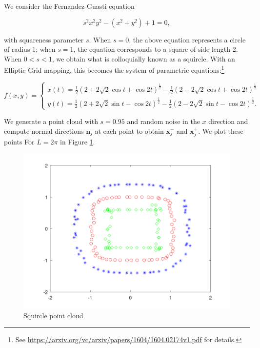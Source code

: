 \begin{solution}
  We consider the Fernandez-Guasti equation

  $$
  s^2 x^2 y^2 - \left( x^2 + y^2 \right) + 1 = 0,
  $$

  with squareness parameter $s$. When $s = 0$, the above equation represents a circle of radius 1; when $s = 1$, the 
  equation corresponds to a square of side length 2. When $0 < s < 1$, we obtain what is colloquially known as a 
  squircle. With an Elliptic Grid mapping, this becomes the system of parametric equations:\footnote{
    See \href{https://arxiv.org/vc/arxiv/papers/1604/1604.02174v1.pdf}{https://arxiv.org/vc/arxiv/papers/1604/1604.02174v1.pdf} 
    for details.
  }

  $$
  f(x, y) = \begin{cases}
    x(t) = \frac{1}{2} \left(2 + 2 \sqrt{2} \cos{t} + \cos{2t}\right)^{\frac{1}{2}} - \frac{1}{2} \left(2 - 2 \sqrt{2} \cos{t} + \cos{2t}\right)^{\frac{1}{2}}\\
    y(t) = \frac{1}{2} \left(2 + 2 \sqrt{2} \sin{t} - \cos{2t}\right)^{\frac{1}{2}} - \frac{1}{2} \left(2 - 2 \sqrt{2} \sin{t} - \cos{2t}\right)^{\frac{1}{2}}.
  \end{cases}
  $$

  \pagebreak
  We generate a point cloud with $s=0.95$ and random noise in the $x$ direction and compute normal directions $\bm{n}_j$ 
  at each point to obtain $\bm{x}^-_j$ and $\bm{x}^+_j$. We plot these points For $L = 2 \pi$ in Figure 
  \ref{fig:problem_1i}.

  \begin{figure}[h]
    \centering
    \includegraphics*[width=\textwidth]{problem_1i.png}
    \caption{Squircle point cloud}
    \label{fig:problem_1i}
  \end{figure}


\end{solution}
